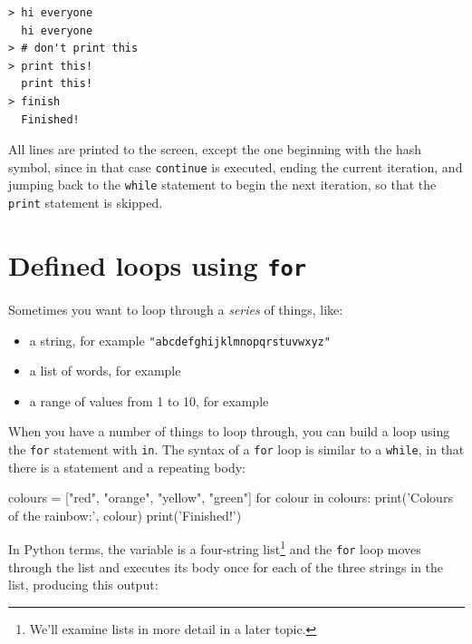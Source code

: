 \begin{Verbatim}[frame=single]
> hi everyone
  hi everyone
> # don't print this
> print this!
  print this!
> finish
  Finished!
\end{Verbatim}

All lines are printed to the screen, except the one beginning with the hash symbol, since in that case \texttt{continue} is executed, ending the current iteration, and jumping back to the \texttt{while} statement to begin the next iteration, so that the \texttt{print} statement is skipped.







\hypertarget{bucles-definidos-usando-for}{%
\section{\texorpdfstring{Defined loops using \texttt{for}}{Bucles definidos usando for}}\label{bucles-definidos-usando-for}}

 

Sometimes you want to loop through a \emph{series} of things, like:

\begin{itemize}[nosep]
    \item a string, for example \verb|"abcdefghijklmnopqrstuvwxyz"|
    \item a list of words, for example 
    \item a range of values from 1 to 10, for example 
\end{itemize}
When you have a number of things to loop through, you can build a loop using the \texttt{for} statement with \texttt{in}. The syntax of a \texttt{for} loop is similar to a \texttt{while}, in that there is a  statement and a repeating body:

\begin{python}[frame=single]
colours = ["red", "orange", "yellow", "green"]
for colour in colours:
    print('Colours of the rainbow:', colour)
print('Finished!')
\end{python}

In Python terms, the variable  is a four-string list\footnote{We'll examine lists in more detail in a later topic.} and the \texttt{for} loop moves through the list and executes its body once for each of the three strings in the list, producing this output:


